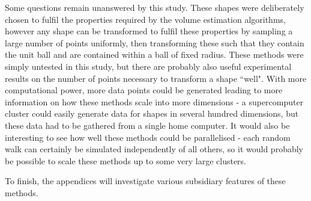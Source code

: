 Some questions remain unanswered by this study. These shapes were deliberately chosen to fulfil the properties required by the volume estimation algorithms, however any shape can be transformed to fulfil these properties by sampling a large number of points uniformly, then transforming these such that they contain the unit ball and are contained within a ball of fixed radius. These methods were simply untested in this study, but there are probably also useful experimental results on the number of points necessary to transform a shape ``well". With more computational power, more data points could be generated leading to more information on how these methods scale into more dimensions - a supercomputer cluster could easily generate data for shapes in several hundred dimensions, but these data had to be gathered from a single home computer. It would also be interesting to see how well these methods could be parallelised - each random walk can certainly be simulated independently of all others, so it would probably be possible to scale these methods up to some very large clusters.

To finish, the appendices will investigate various subsidiary features of these methods.